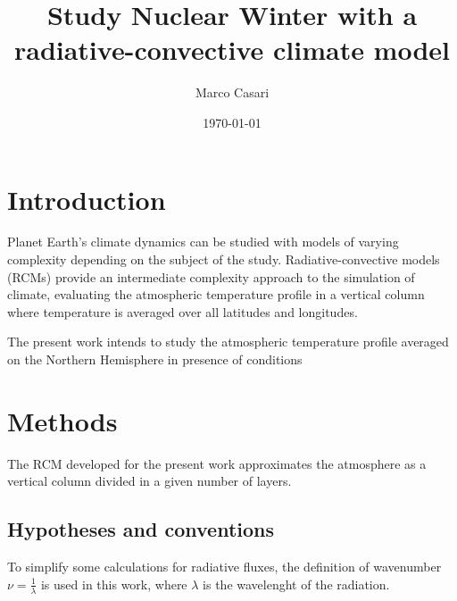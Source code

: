 \documentclass[a4paper,10pt,final,twocolumn]{article}
\begin{document}
\title{Study Nuclear Winter with a radiative-convective climate model} %
\author{Marco Casari}
\date{\today}
\maketitle

\begin{abstract}
\end{abstract}


\section{Introduction}
Planet Earth's climate dynamics can be studied with models of varying complexity depending on the subject of the study. Radiative-convective models (RCMs) provide an intermediate complexity approach to the simulation of climate, evaluating the atmospheric temperature profile in a vertical column where temperature is averaged over all latitudes and longitudes.

The present work intends to study the atmospheric temperature profile averaged on the Northern Hemisphere in presence of conditions 




\section{Methods}
The RCM developed for the present work approximates the atmosphere as a vertical column divided in a given number of layers.



\subsection{Hypotheses and conventions}
\label{sec:Hypotheses and conventions}
To simplify some calculations for radiative fluxes, the definition of wavenumber $\nu = \frac{1}{\lambda}$ is used in this work, where $\lambda$ is the wavelenght of the radiation.
\end{document}

